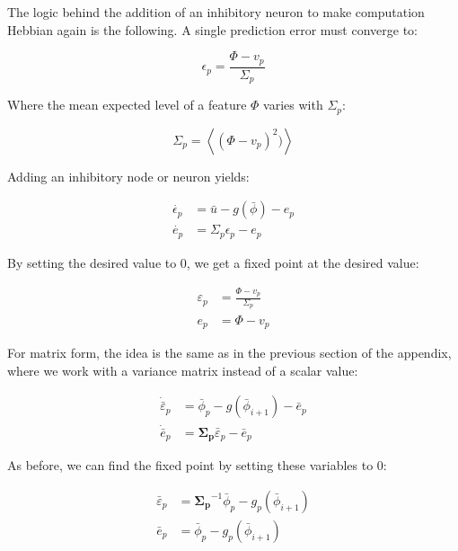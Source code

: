 The logic behind the addition of an inhibitory neuron to make computation Hebbian again is the following. A single prediction error must converge to: 

\begin{equation*}
\epsilon_p = \frac{\Phi - v_p}{\Sigma_p}
\end{equation*}

Where the mean expected level of a feature $\Phi$ varies with $\Sigma_p$: 

\begin{equation*}
\Sigma_p = \left<(\Phi - v_p)^2)\right>
\end{equation*}

Adding an inhibitory node or neuron yields:

\begin{equation*}
    \begin{aligned}
        \dot{\epsilon_p} &= \bar{u} - g(\bar{\phi}) - e_p \\
        \dot{e_p} &= \Sigma_p\epsilon_p - e_p
    \end{aligned}
\end{equation*}

By setting the desired value to 0, we get a fixed point at the desired value:

\begin{equation*}
    \begin{aligned}
\varepsilon_p &= \frac{\Phi - v_p}{\varSigma_p} \\
e_p &= \Phi - v_p
    \end{aligned}
\end{equation*}

For matrix form, the idea is the same as in the previous section of the appendix, where we work with a variance matrix instead of a scalar value:

\begin{equation*}
    \begin{aligned}
\dot{\bar{\varepsilon}}_p &= \bar{\phi}_p - g(\bar{\phi}_{i+1}) - \bar{e}_p  \\
\dot{\bar{e}}_p &= \mathbf{\Sigma_p} \bar{\varepsilon}_p - \bar{e}_p 
    \end{aligned}
\end{equation*}

As before, we can find the fixed point by setting these variables to 0:

\begin{equation*}
    \begin{aligned}
\bar{\varepsilon}_p &= \mathbf{\Sigma_p}^{-1} \bar{\phi}_p - g_p(\bar{\phi}_{i+1})  \\
\bar{e}_p &= \bar{\phi}_p - g_p(\bar{\phi}_{i+1})
    \end{aligned}
\end{equation*}

